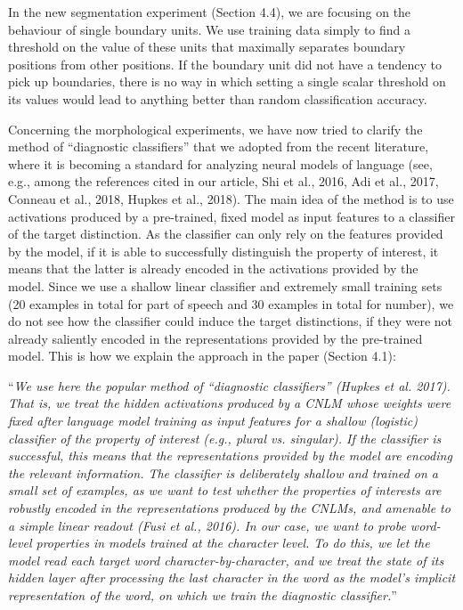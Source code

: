 \documentclass{article}[11pt,a4paper,oneside]
\begin{document}
In the new segmentation experiment (Section 4.4), we are focusing on the behaviour of single boundary units. We use training data simply to find a threshold on the value of these units that maximally separates boundary positions from other positions. If the boundary unit did not have a tendency to pick up boundaries, there is no way in which setting a single scalar threshold on its values would lead to anything better than random classification accuracy.

Concerning the morphological experiments, we have now tried to clarify the method of ``diagnostic classifiers'' that we adopted from the recent literature, where it is becoming a standard for analyzing neural models of language (see, e.g., among the references cited in our article, Shi et al., 2016, Adi et al., 2017, Conneau et al., 2018, Hupkes et al., 2018). The main idea of the method is to use activations produced by a pre-trained, fixed model as input features to a classifier of the target distinction. As the classifier can only rely on the features provided by the model, if it is able to successfully distinguish the property of interest, it means that the latter is already encoded in the activations provided by the model. Since we use a shallow linear classifier and extremely small training sets (20 examples in total for part of speech and 30 examples in total for number), we do not see how the classifier could induce the target distinctions, if they were not already saliently encoded in the representations provided by the pre-trained model. This is how we explain the approach in the paper (Section 4.1):

``\textit{We use here the popular method of ``diagnostic classifiers'' (Hupkes et al. 2017). That is, we treat the hidden activations produced by a CNLM whose weights were fixed after language model training as input features for a shallow (logistic) classifier of the property of interest (e.g., plural vs. singular). If the classifier is successful, this means that the representations provided by the model are encoding the relevant information.  The classifier is deliberately shallow and trained on a small set of examples, as we want to test whether the properties of interests are robustly encoded in the representations produced by the CNLMs, and amenable to a simple linear readout (Fusi et al., 2016). In our case, we want to probe word-level properties in models trained at the character level. To do this, we let the model read each target word character-by-character, and we treat the state of its hidden layer after processing the last character in the word as the model's implicit representation of the word, on which we train the diagnostic classifier.}''
\newline
\end{document}
